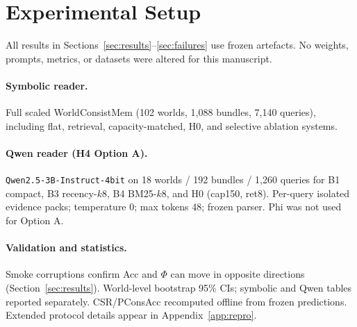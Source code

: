 \section{Experimental Setup}
\label{sec:setup}

All results in Sections~\ref{sec:results}--\ref{sec:failures} use frozen artefacts. No weights, prompts, metrics, or datasets were altered for this manuscript.

\paragraph{Symbolic reader.} Full scaled WorldConsistMem (102 worlds, 1{,}088 bundles, 7{,}140 queries), including flat, retrieval, capacity-matched, H0, and selective ablation systems.

\paragraph{Qwen reader (H4 Option A).} \texttt{Qwen2.5-3B-Instruct-4bit} on 18 worlds / 192 bundles / 1{,}260 queries for B1 compact, B3 recency-$k8$, B4 BM25-$k8$, and H0 (cap150, ret8). Per-query isolated evidence packs; temperature 0; max tokens 48; frozen parser. Phi was not used for Option A.

\paragraph{Validation and statistics.} Smoke corruptions confirm Acc and $\Phi$ can move in opposite directions (Section~\ref{sec:results}). World-level bootstrap 95\% CIs; symbolic and Qwen tables reported separately. CSR/PConsAcc recomputed offline from frozen predictions. Extended protocol details appear in Appendix~\ref{app:repro}.
